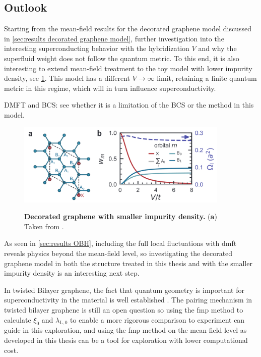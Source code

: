 \documentclass[../notes.tex]{subfiles}
\begin{document}
\subsection*{Outlook}

Starting from the mean-field results for the decorated graphene model discussed in \cref{sec:results decorated graphene model}, further investigation into the interesting superconducting behavior with the hybridization \(V\) and why the superfluid weight does not follow the quantum metric.
To this end, it is also interesting to extend mean-field treatment to the toy model with lower impurity density, see \cref{fig:decorated graphene extended unit cell}.
This model has a different \(V \to \infty\) limit, retaining a finite quantum metric in this regime, which will in turn influence superconductivity.

DMFT and BCS: see whether it is a limitation of the BCS or the method in this model. 

\begin{figure}[t]
	\centering
	\includegraphics[width=0.9\textwidth]{images/extended decorated graphene}
	\label{fig:decorated graphene extended unit cell}
	\caption[Decorated graphene with smaller impurity density.]{\textbf{Decorated graphene with smaller impurity density.} (\textbf{a}) Taken from \cite{wittQuantumGeometryLocal2025}.}
\end{figure}

As seen in \cref{sec:results OBH}, including the full local fluctuations with \gls{dmft} reveals physics beyond the mean-field level, so investigating the decorated graphene model in both the structure treated in this thesis and with the smaller impurity density is an interesting next step.

In twisted Bilayer graphene, the fact that quantum geometry is important for superconductivity in the material is well established \cite{tanakaSuperfluidStiffnessMagicangle2025}.
The pairing mechanism in twisted bilayer graphene is still an open question so using the \gls{fmp} method to calculate \(\xi_0\) and \(\lambda_{\mathrm{L}, 0}\) to enable a more rigorous comparison to experiment can guide in this exploration, and using the \gls{fmp} method on the mean-field level as developed in this thesis can be a tool for exploration with lower computational cost.
	
\end{document}
